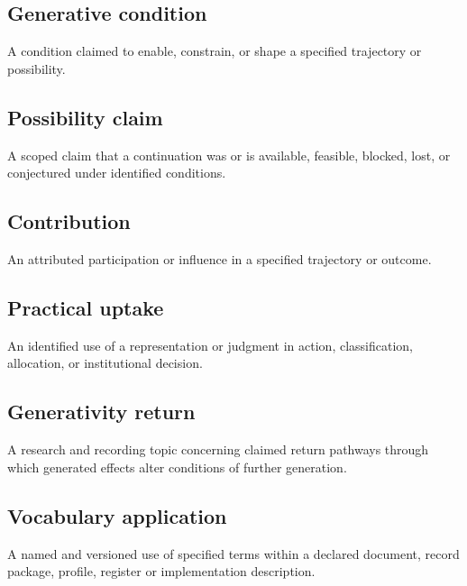 \documentclass[11pt,a4paper]{article}
\begin{document}
\subsection{Generative condition}
A condition claimed to enable, constrain, or shape a specified trajectory or possibility.

\subsection{Possibility claim}
A scoped claim that a continuation was or is available, feasible, blocked, lost, or conjectured under identified conditions.

\subsection{Contribution}
An attributed participation or influence in a specified trajectory or outcome.

\subsection{Practical uptake}
An identified use of a representation or judgment in action, classification, allocation, or institutional decision.

\subsection{Generativity return}
A research and recording topic concerning claimed return pathways through which generated effects alter conditions of further generation.

\subsection{Vocabulary application}
A named and versioned use of specified terms within a declared document, record package, profile, register or implementation description.
\end{document}
